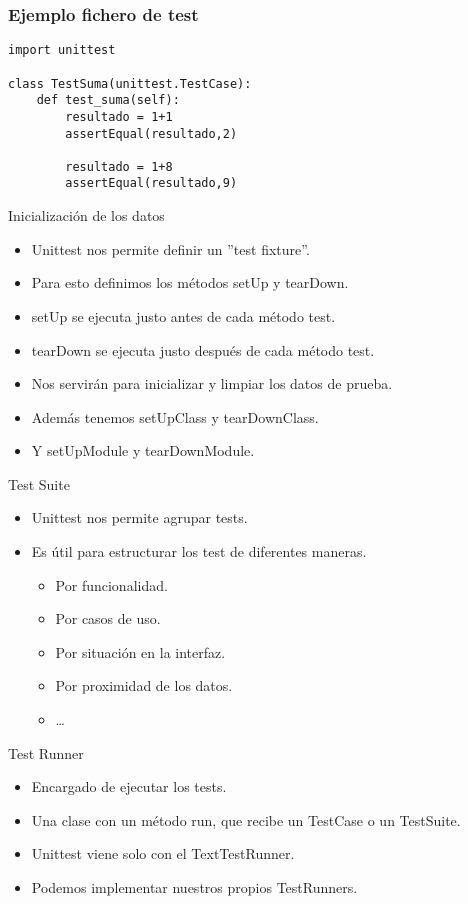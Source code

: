 \documentclass[10pt]{beamer}
\begin{document}
  \begin{frame}[containsverbatim]
    \frametitle{Ejemplo fichero de test}
    \begin{verbatim}
import unittest

class TestSuma(unittest.TestCase):
    def test_suma(self):
        resultado = 1+1
        assertEqual(resultado,2)
    
        resultado = 1+8
        assertEqual(resultado,9)
        \end{verbatim}
  \end{frame}


  \begin{frame}{Inicialización de los datos}
    \begin{itemize}
      \item Unittest nos permite definir un ''test fixture''.
      \item Para esto definimos los métodos setUp y tearDown.
      \item setUp se ejecuta justo antes de cada método test.
      \item tearDown se ejecuta justo después de cada método test.
      \item Nos servirán para inicializar y limpiar los datos de prueba.
      \item Además tenemos setUpClass y tearDownClass.
      \item Y setUpModule y tearDownModule.
    \end{itemize}
  \end{frame}

  \begin{frame}{Test Suite}
    \begin{itemize}
      \item Unittest nos permite agrupar tests.
      \item Es útil para estructurar los test de diferentes maneras.
      \begin{itemize}
        \item Por funcionalidad.
        \item Por casos de uso.
        \item Por situación en la interfaz.
        \item Por proximidad de los datos.
        \item \dots
      \end{itemize}
    \end{itemize}
  \end{frame}

  \begin{frame}{Test Runner}
    \begin{itemize}
      \item Encargado de ejecutar los tests.
      \item Una clase con un método run, que recibe un TestCase o un TestSuite.
      \item Unittest viene solo con el TextTestRunner.
      \item Podemos implementar nuestros propios TestRunners.
    \end{itemize}
  \end{frame}
\end{document}

